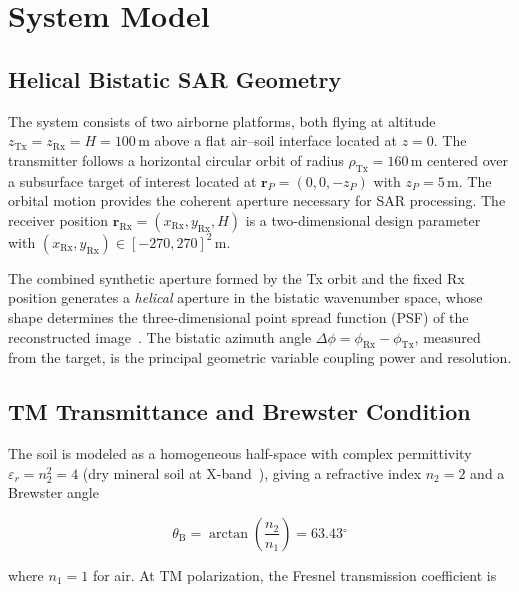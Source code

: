 \documentclass[journal]{IEEEtran}
\newcommand{\Rx}{\mathrm{Rx}}
\newcommand{\Tx}{\mathrm{Tx}}
\newcommand{\rRx}{\mathbf{r}_{\Rx}}
\newcommand{\gdeg}{\ensuremath{^{\circ}}}
\newcommand{\thetaB}{\theta_{\mathrm{B}}}
\begin{document}
\section{System Model}
\label{sec:model}

\subsection{Helical Bistatic SAR Geometry}

The system consists of two airborne platforms, both flying at altitude
$z_{\Tx} = z_{\Rx} = H = 100\,\mathrm{m}$ above a flat air--soil interface
located at $z = 0$. The transmitter follows a horizontal circular orbit of
radius $\rho_{\Tx} = 160\,\mathrm{m}$ centered over a subsurface target of
interest located at $\mathbf{r}_P = (0, 0, -z_P)$ with $z_P = 5\,\mathrm{m}$.
The orbital motion provides the coherent aperture necessary for SAR processing.
The receiver position $\rRx = (x_{\Rx}, y_{\Rx}, H)$ is a two-dimensional
design parameter with $(x_{\Rx}, y_{\Rx}) \in [-270, 270]^2\,\mathrm{m}$.

The combined synthetic aperture formed by the Tx orbit and the fixed Rx
position generates  a \emph{helical} aperture in the bistatic wavenumber space,
whose shape determines the three-dimensional point spread function (PSF) of the
reconstructed image~\cite{soumekh1999}. The bistatic azimuth angle
$\Delta\phi = \phi_{\Rx} - \phi_{\Tx}$, measured from the target, is the
principal geometric variable coupling power and resolution.

\subsection{TM Transmittance and Brewster Condition}

The soil is modeled as a homogeneous half-space with complex permittivity
$\varepsilon_r = n_2^2 = 4$ (dry mineral soil at X-band~\cite{ulaby2014}),
giving a refractive index $n_2 = 2$ and a Brewster angle

\begin{equation}
  \thetaB = \arctan\!\left(\frac{n_2}{n_1}\right) = 63.43\gdeg
  \label{eq:thetaB}
\end{equation}

where $n_1 = 1$ for air. At TM polarization, the Fresnel transmission
coefficient is
\end{document}
